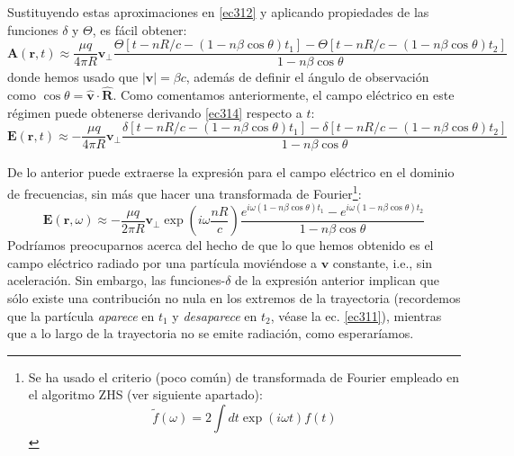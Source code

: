 \documentclass[12 pt, a4paper]{article} %
\numberwithin{equation}{section}
\numberwithin{figure}{section}
\numberwithin{table}{section}
\newcommand{\vect}[1]{\boldsymbol{\mathbf{#1}}}
\begin{document}
Sustituyendo estas aproximaciones en \eqref{ec312} y aplicando propiedades de las funciones $\delta$ y $\Theta$, es fácil obtener:
\begin{equation}
	\vect{A}\left(\vect{r}, t\right)\approx\frac{\mu q}{4\pi R}\vect{v}_\perp\frac{\Theta\left[t-nR/c-\left(1-n\beta\cos{\theta}\right)t_1\right]-\Theta\left[t-nR/c-\left(1-n\beta\cos{\theta}\right)t_2\right]}{1-n\beta\cos{\theta}}\label{ec314}
\end{equation}
donde hemos usado que $\left|\vect{v}\right|=\beta c$, además de definir el ángulo de observación como $\cos{\theta}=\hat{\vect{v}}\cdot\hat{\vect{R}}$. Como comentamos anteriormente, el campo eléctrico en este régimen puede obtenerse derivando \eqref{ec314} respecto a $t$:
\begin{equation}
	\vect{E}\left(\vect{r}, t\right)\approx-\frac{\mu q}{4\pi R}\vect{v}_\perp\frac{\delta\left[t-nR/c-\left(1-n\beta\cos{\theta}\right)t_1\right]-\delta\left[t-nR/c-\left(1-n\beta\cos{\theta}\right)t_2\right]}{1-n\beta\cos{\theta}}\label{ec315}
\end{equation}

De lo anterior puede extraerse la expresión para el campo eléctrico en el dominio de frecuencias, sin más que hacer una transformada de Fourier\footnote{ Se ha usado el criterio (poco común) de transformada de Fourier empleado en el algoritmo ZHS (ver siguiente apartado):
	$$\tilde{f}(\omega)=2\int dt \exp\left(i\omega t\right)f(t)$$}:
\begin{equation}
	\vect{E}\left(\vect{r}, \omega\right)\approx-\frac{\mu q}{2\pi R}\vect{v}_\perp \exp\left(i\omega\frac{nR}{c}\right)\frac{e^{i\omega(1-n\beta\cos{\theta})t_1}-e^{i\omega(1-n\beta\cos{\theta})t_2}}{1-n\beta\cos{\theta}}\label{ec316}
\end{equation}
Podríamos preocuparnos acerca del hecho de que lo que hemos obtenido es el campo eléctrico radiado por una partícula moviéndose a $\vect{v}$ constante, i.e., sin aceleración. Sin embargo, las funciones-$\delta$ de la expresión anterior implican que sólo existe una contribución no nula en los extremos de la trayectoria (recordemos que la partícula \textit{aparece} en $t_1$ y \textit{desaparece} en $t_2$, véase la ec. \ref{ec311}), mientras que a lo largo de la trayectoria no se emite radiación, como esperaríamos.
\end{document}
